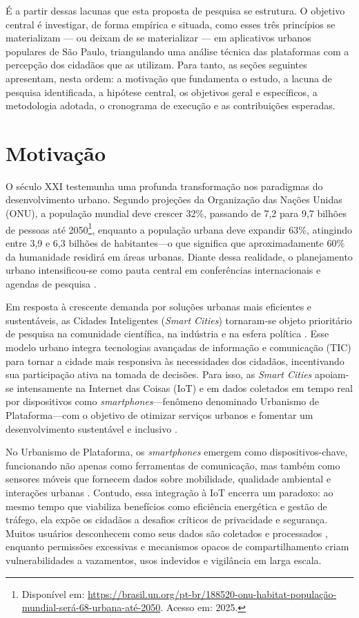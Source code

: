 \documentclass[
	12pt,				%
	oneside,			%
	a4paper,			%
	english,			%
	brazil				%
	]{abntex2ppgsi}
\begin{document}
    É a partir dessas lacunas que esta proposta de pesquisa se estrutura. O objetivo central é investigar, de forma empírica e situada, como esses três princípios se materializam — ou deixam de se materializar — em aplicativos urbanos populares de São Paulo, triangulando uma análise técnica das plataformas com a percepção dos cidadãos que as utilizam. Para tanto, as seções seguintes apresentam, nesta ordem: a motivação que fundamenta o estudo, a lacuna de pesquisa identificada, a hipótese central, os objetivos geral e específicos, a metodologia adotada, o cronograma de execução e as contribuições esperadas.

    
    
    \section{Motivação}

   O século XXI testemunha uma profunda transformação nos paradigmas do desenvolvimento urbano. Segundo projeções da Organização das Nações Unidas (ONU), a população mundial deve crescer 32\%, passando de 7,2 para 9,7 bilhões de pessoas até 2050\footnote{Disponível em: \url{https://brasil.un.org/pt-br/188520-onu-habitat-população-mundial-será-68-urbana-até-2050}.
   Acesso em: 2025.}, enquanto a população urbana deve expandir 63\%, atingindo entre 3,9 e 6,3 bilhões de habitantes---o que significa que aproximadamente 60\% da humanidade residirá em áreas urbanas. Diante dessa realidade, o planejamento urbano intensificou-se como pauta central em conferências internacionais e agendas de pesquisa \cite{EREMIA201712}.

   Em resposta à crescente demanda por soluções urbanas mais eficientes e sustentáveis, as Cidades Inteligentes (\textit{Smart Cities}) tornaram-se objeto prioritário de pesquisa na comunidade científica, na indústria e na esfera política \cite{EREMIA201712}. Esse modelo urbano integra tecnologias avançadas de informação e comunicação (TIC) para tornar a cidade mais responsiva às necessidades dos cidadãos, incentivando sua participação ativa na tomada de decisões. Para isso, as \textit{Smart Cities} apoiam-se intensamente na Internet das Coisas (IoT) e em dados coletados em tempo real por dispositivos como \textit{smartphones}---fenômeno denominado Urbanismo de Plataforma---com o objetivo de otimizar serviços urbanos e fomentar um desenvolvimento sustentável e inclusivo \cite{Chakrabarty}.

    No Urbanismo de Plataforma, os \textit{smartphones} emergem como dispositivos-chave, funcionando não apenas como ferramentas de comunicação, mas também como sensores móveis que fornecem dados sobre mobilidade, qualidade ambiental e interações urbanas \cite{Rose}. Contudo, essa integração à IoT encerra um paradoxo: ao mesmo tempo que viabiliza benefícios como eficiência energética e gestão de tráfego, ela expõe os cidadãos a desafios críticos de privacidade e segurança. Muitos usuários desconhecem como seus dados são coletados e processados \cite{Whaiduzzaman}, enquanto permissões excessivas e mecanismos opacos de compartilhamento criam vulnerabilidades a vazamentos, usos indevidos e vigilância em larga escala.
\end{document}
